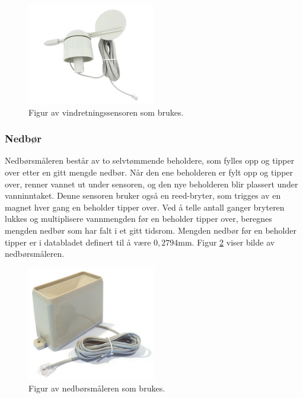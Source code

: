 \begin{figure}[H]
    \centering
    \includegraphics[width=0.5\textwidth]{implementering/vindretning.png}
    \caption{Figur av vindretningssensoren som brukes.}
    \label{fig:vindretning}
\end{figure}


\subsubsection{Nedbør}\label{sec:impl:vaer:regn}

Nedbørsmåleren består av to selvtømmende beholdere, som fylles opp og tipper over etter en gitt mengde nedbør. 
Når den ene beholderen er fylt opp og tipper over, renner vannet ut under sensoren, og den nye beholderen blir plassert under vanninntaket. 
Denne sensoren bruker også en reed-bryter, som trigges av en magnet hver gang en beholder tipper over. 
Ved å telle antall ganger bryteren lukkes og multiplisere vannmengden før en beholder tipper over, beregnes mengden nedbør som har falt i et gitt tidsrom. 
Mengden nedbør før en beholder tipper er i databladet\cite{weather} definert til å være $0,2794$mm. Figur \ref{fig:impl:vaer:regn} viser bilde av nedbørsmåleren.

\begin{figure}[H]
    \centering
    \includegraphics[width=0.5\textwidth]{implementering/rain_gauge.jpg}
    \caption{Figur av nedbørsmåleren som brukes.}
    \label{fig:impl:vaer:regn}
\end{figure}


